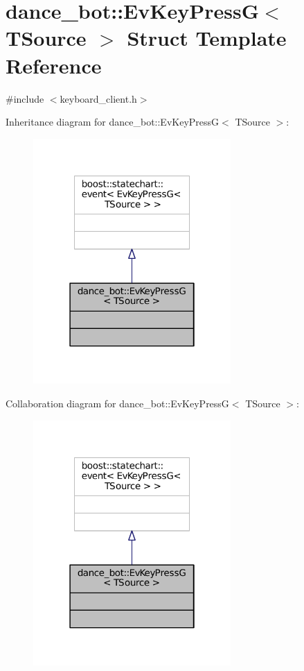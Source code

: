 \hypertarget{structdance__bot_1_1EvKeyPressG}{}\section{dance\+\_\+bot\+:\+:Ev\+Key\+PressG$<$ T\+Source $>$ Struct Template Reference}
\label{structdance__bot_1_1EvKeyPressG}


{\ttfamily \#include $<$keyboard\+\_\+client.\+h$>$}



Inheritance diagram for dance\+\_\+bot\+:\+:Ev\+Key\+PressG$<$ T\+Source $>$\+:
\nopagebreak
\begin{figure}[H]
\begin{center}
\leavevmode
\includegraphics[width=214pt]{structdance__bot_1_1EvKeyPressG__inherit__graph}
\end{center}
\end{figure}


Collaboration diagram for dance\+\_\+bot\+:\+:Ev\+Key\+PressG$<$ T\+Source $>$\+:
\nopagebreak
\begin{figure}[H]
\begin{center}
\leavevmode
\includegraphics[width=214pt]{structdance__bot_1_1EvKeyPressG__coll__graph}
\end{center}
\end{figure}


